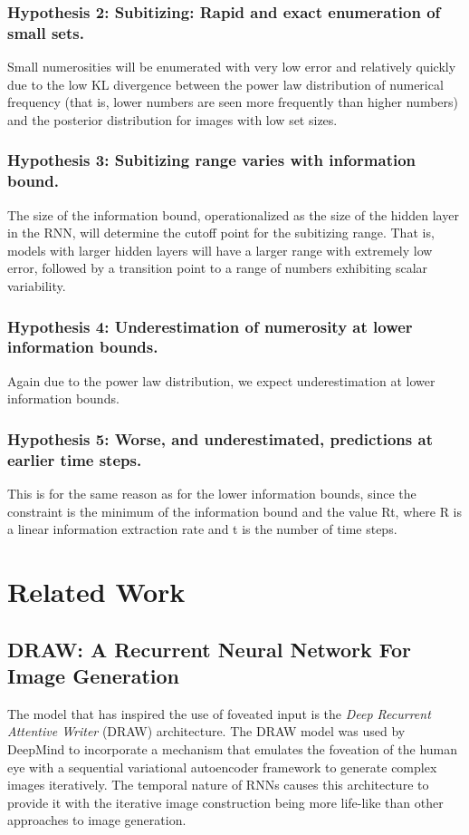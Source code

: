 \documentclass{article}
\begin{document}
\subsubsection{Hypothesis 2: Subitizing: Rapid and exact enumeration of small sets.}
Small numerosities will be enumerated with very low error and relatively quickly due to the low KL divergence between the power law distribution of numerical frequency (that is, lower numbers are seen more frequently than higher numbers) and the posterior distribution for images with low set sizes.
\subsubsection{Hypothesis 3: Subitizing range varies with information bound.}
The size of the information bound, operationalized as the size of the hidden layer in the RNN, will determine the cutoff point for the subitizing range. That is, models with larger hidden layers will have a larger range with extremely low error, followed by a transition point to a range of numbers exhibiting scalar variability.
\subsubsection{Hypothesis 4: Underestimation of numerosity at lower information bounds.}
Again due to the power law distribution, we expect underestimation at lower information bounds.
\subsubsection{Hypothesis 5: Worse, and underestimated, predictions at earlier time steps.}
This is for the same reason as for the lower information bounds, since the constraint is the minimum of the information bound and the value Rt, where R is a linear information extraction rate and t is the number of time steps.

\section{Related Work}
\subsection{DRAW: A Recurrent Neural Network For Image Generation}
The model that has inspired the use of foveated input is the \textit{Deep Recurrent Attentive Writer} (DRAW)\cite{draw} architecture. The DRAW model was used by DeepMind to incorporate a mechanism that emulates the foveation of the human eye with a sequential variational autoencoder framework to generate complex images iteratively. The temporal nature of RNNs causes this architecture to provide it with the iterative image construction being more life-like than other approaches to image generation.
\end{document}

